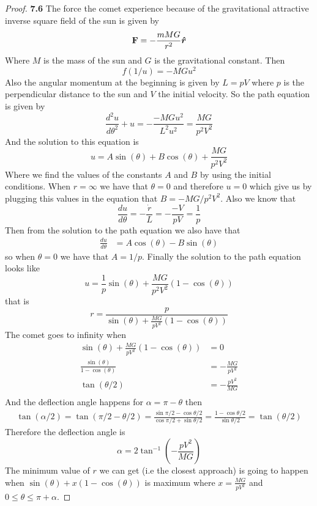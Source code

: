 \documentclass[11pt]{article}
\newcommand{\hatr}{\bm{\hat{r}}}
\theoremstyle{definition}
\begin{document}
	\begin{proof}{\textbf{7.6}}
        The force the comet experience because of the gravitational attractive inverse
        square field of the sun is given by
        $$\vectorbold{F} = - \frac{mMG}{r^2} \hatr$$
        Where $M$ is the mass of the sun and $G$ is the gravitational constant.
        Then
        $$f(1/u) = -MGu^2$$
        Also the angular momentum at the beginning is given by $L = pV$ where $p$ is
        the perpendicular distance to the sun and $V$ the initial velocity. So the
        path equation is given by
        $$\frac{d^2u}{d\theta^2} + u = -\frac{-MGu^2}{L^2u^2} = \frac{MG}{p^2V^2}$$
        And the solution to this equation is
        $$u = A\sin(\theta) + B\cos(\theta) + \frac{MG}{p^2V^2}$$
        Where we find the values of the constants $A$ and $B$ by using the initial
        conditions. When $r = \infty$ we have that $\theta = 0$ and therefore $u =0$
        which give us by plugging this values in the equation that $B = -MG / p^2V^2$.
        Also we know that
        $$\frac{du}{d\theta} = -\frac{\dot{r}}{L} = -\frac{-V}{pV} = \frac{1}{p}$$
        Then from the solution to the path equation we also have that
        \begin{align*}
            \frac{du}{d\theta} &= A\cos(\theta) - B\sin(\theta)
        \end{align*}
        so when $\theta=0$ we have that $A = 1/p$. Finally the solution to the path
        equation looks like
        $$u = \frac{1}{p}\sin(\theta) + \frac{MG}{p^2V^2}(1 - \cos(\theta))$$
        that is
        $$r = \frac{p}{\sin(\theta) + \frac{MG}{pV^2}(1 - \cos(\theta))}$$
        The comet goes to infinity when
        \begin{align*}
            \sin(\theta) + \frac{MG}{pV^2}(1 - \cos(\theta)) &= 0\\
            \frac{\sin(\theta)}{1-\cos(\theta)} &= -\frac{MG}{pV^2}\\
            \tan(\theta/2) &= -\frac{pV^2}{MG}\\    
        \end{align*}
        And the deflection angle happens for $\alpha = \pi - \theta$ then
        \begin{align*}
            \tan(\alpha/2) = \tan(\pi/2 - \theta/2) =
            \frac{\sin \pi/2 - \cos \theta/2}{\cos \pi/2 + \sin \theta/2} =
            \frac{1 - \cos \theta/2}{\sin \theta/2} = \tan(\theta/2)    
        \end{align*}        
        Therefore the deflection angle is
        $$\alpha = 2\tan^{-1}\left(-\frac{pV^2}{MG}\right)$$
        The minimum value of $r$ we can get (i.e the closest approach) is going to
        happen when $\sin(\theta) + x(1 - \cos(\theta))$ is maximum where
        $x = \frac{MG}{pV^2}$ and $0\leq\theta\leq \pi + \alpha$.
    \end{proof}
\end{document}
